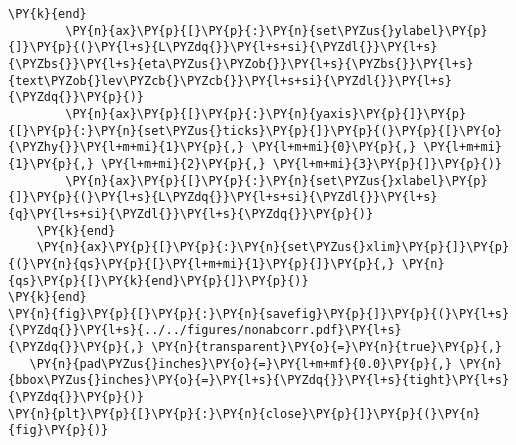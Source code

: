 \begin{Verbatim}[commandchars=\\\{\}]
        \PY{k}{end}
        \PY{n}{ax}\PY{p}{[}\PY{p}{:}\PY{n}{set\PYZus{}ylabel}\PY{p}{]}\PY{p}{(}\PY{l+s}{L\PYZdq{}}\PY{l+s+si}{\PYZdl{}}\PY{l+s}{\PYZbs{}}\PY{l+s}{eta\PYZus{}\PYZob{}}\PY{l+s}{\PYZbs{}}\PY{l+s}{text\PYZob{}lev\PYZcb{}\PYZcb{}}\PY{l+s+si}{\PYZdl{}}\PY{l+s}{\PYZdq{}}\PY{p}{)}
        \PY{n}{ax}\PY{p}{[}\PY{p}{:}\PY{n}{yaxis}\PY{p}{]}\PY{p}{[}\PY{p}{:}\PY{n}{set\PYZus{}ticks}\PY{p}{]}\PY{p}{(}\PY{p}{[}\PY{o}{\PYZhy{}}\PY{l+m+mi}{1}\PY{p}{,} \PY{l+m+mi}{0}\PY{p}{,} \PY{l+m+mi}{1}\PY{p}{,} \PY{l+m+mi}{2}\PY{p}{,} \PY{l+m+mi}{3}\PY{p}{]}\PY{p}{)}
        \PY{n}{ax}\PY{p}{[}\PY{p}{:}\PY{n}{set\PYZus{}xlabel}\PY{p}{]}\PY{p}{(}\PY{l+s}{L\PYZdq{}}\PY{l+s+si}{\PYZdl{}}\PY{l+s}{q}\PY{l+s+si}{\PYZdl{}}\PY{l+s}{\PYZdq{}}\PY{p}{)}
    \PY{k}{end}
    \PY{n}{ax}\PY{p}{[}\PY{p}{:}\PY{n}{set\PYZus{}xlim}\PY{p}{]}\PY{p}{(}\PY{n}{qs}\PY{p}{[}\PY{l+m+mi}{1}\PY{p}{]}\PY{p}{,} \PY{n}{qs}\PY{p}{[}\PY{k}{end}\PY{p}{]}\PY{p}{)}
\PY{k}{end}
\PY{n}{fig}\PY{p}{[}\PY{p}{:}\PY{n}{savefig}\PY{p}{]}\PY{p}{(}\PY{l+s}{\PYZdq{}}\PY{l+s}{../../figures/nonabcorr.pdf}\PY{l+s}{\PYZdq{}}\PY{p}{,} \PY{n}{transparent}\PY{o}{=}\PY{n}{true}\PY{p}{,}
   \PY{n}{pad\PYZus{}inches}\PY{o}{=}\PY{l+m+mf}{0.0}\PY{p}{,} \PY{n}{bbox\PYZus{}inches}\PY{o}{=}\PY{l+s}{\PYZdq{}}\PY{l+s}{tight}\PY{l+s}{\PYZdq{}}\PY{p}{)}
\PY{n}{plt}\PY{p}{[}\PY{p}{:}\PY{n}{close}\PY{p}{]}\PY{p}{(}\PY{n}{fig}\PY{p}{)}
\end{Verbatim}

